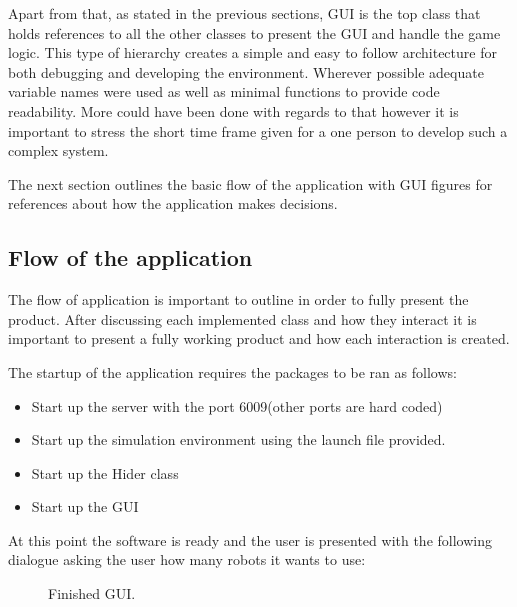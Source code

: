      Apart from that, as stated in the previous sections, GUI is the top class that holds references to all the other classes to present the GUI and handle the game logic. This type of hierarchy creates a simple and easy to follow architecture for both debugging and developing the environment. Wherever possible adequate variable names were used as well as minimal functions to provide code readability. More could have been done with regards to that however it is important to stress the short time frame given for a one person to develop such a complex system.

      The next section outlines the basic flow of the application with GUI figures for references about how the application makes decisions.

    \subsection{Flow of the application}
      The flow of application is important to outline in order to fully present the product. After discussing each implemented class and how they interact it is important to present a fully working product and how each interaction is created.

      The startup of the application requires the packages to be ran as follows:
        \begin{itemize}
          \item Start up the server with the port 6009(other ports are hard coded)
          \item Start up the simulation environment using the launch file provided.
          \item Start up the Hider class
          \item Start up the GUI
        \end{itemize}
      At this point the software is ready and the user is presented with the following dialogue asking the user how many robots it wants to use:

      \begin{figure}[htp]
        \centering
        \caption{Finished GUI.}
      \end{figure}

